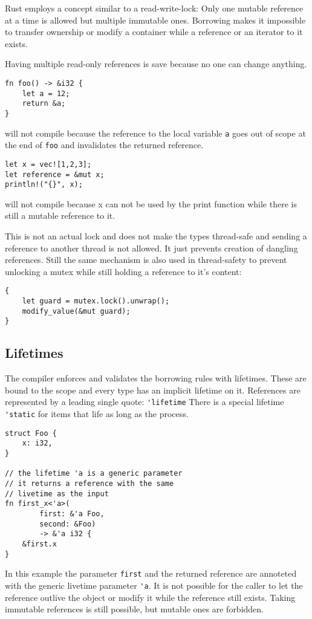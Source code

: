 \documentclass[conference,twocolumn]{IEEEtran}
\begin{document}
Rust employs a concept similar to a read-write-lock: Only one mutable reference at a time is allowed but multiple immutable ones. Borrowing makes it impossible to transfer ownership or modify a container while a reference or an iterator to it exists.

Having multiple read-only references is save because no one can change anything.

\begin{lstlisting}[frame=single]
fn foo() -> &i32 {
    let a = 12;
    return &a;
}
\end{lstlisting}
will not compile because the reference to the local variable \verb|a| goes out of scope at the end of \verb|foo| and invalidates the returned reference.


\begin{lstlisting}[frame=single]
let x = vec![1,2,3];
let reference = &mut x;
println!("{}", x);
\end{lstlisting}
will not compile because x can not be used by the print function while there is still a mutable reference to it.

This is not an actual lock and does not make the types thread-safe and sending a reference to another thread is not allowed. It just prevents creation of dangling references. Still the same mechanism is also used in thread-safety to prevent unlocking a mutex while still holding a reference to it's content:

\begin{lstlisting}[frame=single]
{
    let guard = mutex.lock().unwrap();
    modify_value(&mut guard);
}
\end{lstlisting}


\subsection{Lifetimes}
The compiler enforces and validates the borrowing rules with lifetimes. These are bound to the scope and every type has an implicit lifetime on it.
References are represented by a leading single quote: \verb|'lifetime|
There is a special lifetime \verb|'static| for items that life as long as the process.

\begin{lstlisting}[frame=single]
struct Foo {
    x: i32,
}

// the lifetime 'a is a generic parameter
// it returns a reference with the same 
// livetime as the input
fn first_x<'a>(
        first: &'a Foo,
        second: &Foo)
        -> &'a i32 {
    &first.x
}
\end{lstlisting}
In this example the parameter \verb|first| and the returned reference are annoteted with the generic livetime parameter \verb|'a|. It is not possible for the caller to let the reference outlive the object or modify it while the reference still exists. Taking immutable references is still possible, but mutable ones are forbidden.
\end{document}
